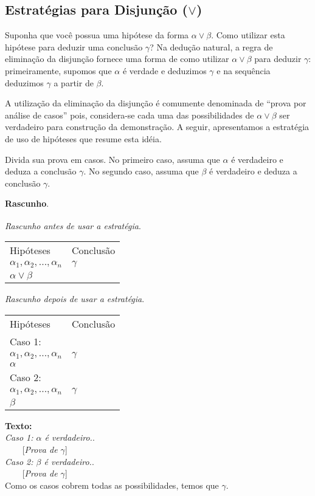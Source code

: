 \subsection{Estratégias para Disjunção ($\lor$)}

Suponha que você possua uma hipótese da forma $\alpha\lor\beta$. Como
utilizar esta hipótese para deduzir uma conclusão $\gamma$? Na dedução
natural, a regra de eliminação da disjunção fornece uma forma de como
utilizar $\alpha\lor\beta$ para deduzir $\gamma$: primeiramente,
supomos que $\alpha$ é verdade e deduzimos $\gamma$ e na sequência
deduzimos $\gamma$ a partir de $\beta$.

A utilização da eliminação da disjunção é comumente denominada de
``prova por análise de casos'' pois, considera-se cada uma das
possibilidades de $\alpha\lor\beta$ ser verdadeiro para construção da
demonstração. A seguir, apresentamos a estratégia de uso de hipóteses
que resume esta idéia.

\begin{HypothesisStrategy}
Divida sua prova em casos. No primeiro caso, assuma que $\alpha$ é
verdadeiro e deduza a conclusão $\gamma$. No segundo caso, assuma que
$\beta$ é verdadeiro e deduza a conclusão $\gamma$.
\begin{flushleft}
\textbf{Rascunho}.\\
\verb| |\\

\textit{Rascunho antes de usar a estratégia}.
\verb| |\\
\begin{tabular}{ll}
Hipóteses & Conclusão \\
$\alpha_1,\alpha_2,...,\alpha_n$ & $\gamma$\\
$\alpha\lor\beta$ & \\
\end{tabular}

\textit{Rascunho depois de usar a estratégia}.
\verb| |\\
\begin{tabular}{ll}
Hipóteses & Conclusão \\
Caso 1: & \\
$\alpha_1,\alpha_2,...,\alpha_n$ & $\gamma$\\
$\alpha$ & \\
Caso 2: & \\
$\alpha_1,\alpha_2,...,\alpha_n$ & $\gamma$\\
$\beta$ & \\
\end{tabular}
\end{flushleft}
\begin{flushleft}
\textbf{Texto:}\\
\textit{Caso 1: $\alpha$ é verdadeiro.}.\\
\verb|    |[\textit{Prova de $\gamma$}]\\
\textit{Caso 2: $\beta$ é verdadeiro.}.\\
\verb|    |[\textit{Prova de $\gamma$}]\\
Como os casos cobrem todas as possibilidades, temos que $\gamma$.
\end{flushleft}
\end{HypothesisStrategy}

